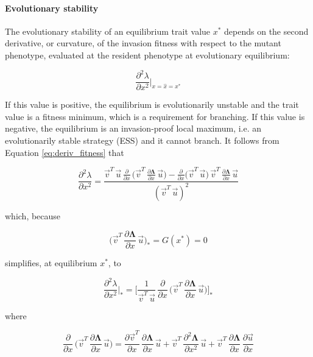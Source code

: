 \paragraph{Evolutionary stability} The evolutionary stability of an equilibrium trait value $x^*$ depends on the second derivative, or curvature, of the invasion fitness with respect to the mutant phenotype, evaluated at the resident phenotype at evolutionary equilibrium:

\begin{equation}
    \frac{\partial^2 \lambda}{\partial x^2}\bigg|_{x=\hat{x}=x^*}
\end{equation}

If this value is positive, the equilibrium is evolutionarily unstable and the trait value is a fitness minimum, which is a requirement for branching. If this value is negative, the equilibrium is an invasion-proof local maximum, i.e. an evolutionarily stable strategy (ESS) and it cannot branch. It follows from Equation \ref{eq:deriv_fitness} that

\begin{equation}
    \frac{\partial^2 \lambda}{\partial x^2} = \frac{\overrightarrow{v}^T\,\overrightarrow{u}\,\frac{\partial}{\partial x}\,\big(\overrightarrow{v}^T\,\frac{\partial \pmb{\Lambda}}{\partial x}\,\overrightarrow{u}\big) - \frac{\partial}{\partial x} \big( \overrightarrow{v}^T \, \overrightarrow{u} \big) \, \overrightarrow{v}^T \, \frac{\partial \pmb{\Lambda}}{\partial x}\,\overrightarrow{u}}{(\overrightarrow{v}^T\,\overrightarrow{u})^2}
\end{equation}

which, because

\begin{equation}
    \bigg( \overrightarrow{v}^T\,\frac{
    \partial \pmb \Lambda}{\partial x}\,\overrightarrow{u} \bigg)_* = G(x^*) = 0
\end{equation}

simplifies, at equilibrium $x^*$, to

\begin{equation}
    \frac{\partial^2 \lambda}{\partial x^2}\bigg|_* = \Bigg[ \frac{1}{\overrightarrow{v}^T\,\overrightarrow{u}}\,\frac{\partial}{\partial x}\,\bigg(\overrightarrow{v}^T\,\frac{\partial \pmb{\Lambda}}{\partial x}\,\overrightarrow{u}\bigg) \Bigg]_*
    \label{eq:fitness_curvature_equilibrium}
\end{equation}

where

\begin{equation}
    \frac{\partial}{\partial x} \, \bigg(\overrightarrow{v}^T \, \frac{\partial \pmb{\Lambda}}{\partial x} \, \overrightarrow{u}\bigg) = \frac{\partial \overrightarrow{v}^T}{\partial x}\,\frac{\partial \pmb{\Lambda}}{\partial x}\,\overrightarrow{u} + \overrightarrow{v}^T\,\frac{\partial^2 \pmb{\Lambda}}{\partial x^2}\,\overrightarrow{u} + \overrightarrow{v}^T\,\frac{\partial \pmb{\Lambda}}{\partial x}\,\frac{\partial \overrightarrow{u}}{\partial x}
    \label{eq:deriv_num_gradient_unevaluated}
\end{equation}

